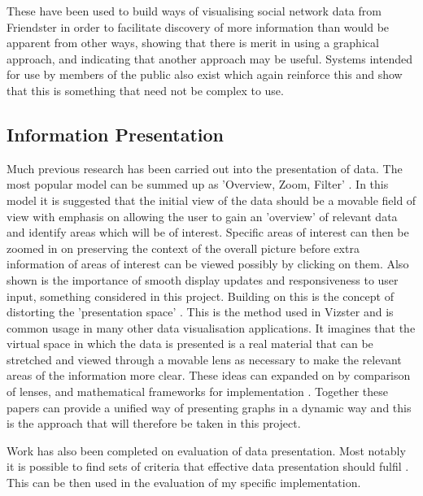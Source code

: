 \documentclass[12pt,a4paper]{article}
\begin{document}
These have been used to build ways of visualising social network data from Friendster \cite{heer2005vizster} in order to facilitate discovery of more information than would be apparent from other ways, showing that there is merit in using a graphical approach, and indicating that another approach may be useful. Systems intended for use by members of the public also exist \cite{wolfram} which again reinforce this and show that this is something that need not be complex to use.

\subsection{Information Presentation}
\noindent
Much previous research has been carried out into the presentation of data. The most popular model can be summed up as 'Overview, Zoom, Filter' \cite{shneiderman1996eyes}. In this model it is suggested that the initial view of the data should be a movable field of view with emphasis on allowing the user to gain an 'overview' of relevant data and identify areas which will be of interest. Specific areas of interest can then be zoomed in on preserving the context of the overall picture before extra information of areas of interest can be viewed possibly by clicking on them. Also shown is the importance of smooth display updates and responsiveness to user input, something considered in this project. Building on this is the concept of distorting the 'presentation space' \cite{carpendale2001framework}. This is the method used in Vizster and is common usage in many other data visualisation applications. It imagines that the virtual space in which the data is presented is a real material that can be stretched and viewed through a movable lens as necessary to make the relevant areas of the information more clear. These ideas can expanded on by comparison of lenses, and mathematical frameworks for implementation \cite{leung1994review}. Together these papers can provide a unified way of presenting graphs in a dynamic way and this is the approach that will therefore be taken in this project.

Work has also been completed on evaluation of data presentation. Most notably it is possible to find sets of criteria that effective data presentation should fulfil \cite{tufte1983visual}. This can be then used in the evaluation of my specific implementation.
\end{document}
